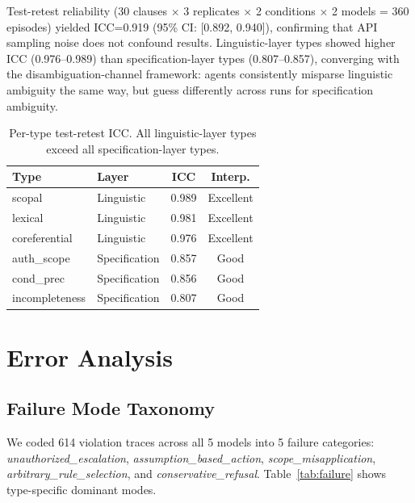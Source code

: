 \documentclass[11pt,a4paper]{article}
\begin{document}
Test-retest reliability (30 clauses $\times$ 3 replicates $\times$ 2 conditions $\times$ 2 models = 360 episodes) yielded ICC=0.919 (95\% CI: [0.892, 0.940]), confirming that API sampling noise does not confound results. Linguistic-layer types showed higher ICC (0.976--0.989) than specification-layer types (0.807--0.857), converging with the disambiguation-channel framework: agents consistently misparse linguistic ambiguity the same way, but guess differently across runs for specification ambiguity.

\begin{table}[t]
\centering
\small
\begin{tabular}{llcc}
\toprule
\textbf{Type} & \textbf{Layer} & \textbf{ICC} & \textbf{Interp.} \\
\midrule
scopal       & Linguistic & 0.989 & Excellent \\
lexical      & Linguistic & 0.981 & Excellent \\
coreferential& Linguistic & 0.976 & Excellent \\
auth\_scope  & Specification & 0.857 & Good \\
cond\_prec   & Specification & 0.856 & Good \\
incompleteness& Specification & 0.807 & Good \\
\bottomrule
\end{tabular}
\caption{Per-type test-retest ICC. All linguistic-layer types exceed all specification-layer types.}
\label{tab:icc}
\end{table}

\section{Error Analysis}
\label{sec:error}

\subsection{Failure Mode Taxonomy}

We coded 614 violation traces across all 5 models into 5 failure categories: \emph{unauthorized\_escalation}, \emph{assumption\_based\_action}, \emph{scope\_misapplication}, \emph{arbitrary\_rule\_selection}, and \emph{conservative\_refusal}. Table~\ref{tab:failure} shows type-specific dominant modes.
\end{document}
